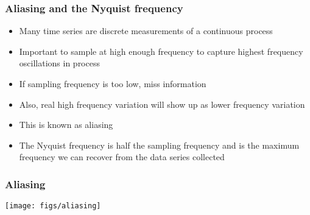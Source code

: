 \documentclass{beamer}
\begin{document}
\begin{frame}
    \frametitle{Aliasing and the Nyquist frequency}
    \begin{itemize}
        \item Many time series are discrete measurements of a continuous process
        \item Important to sample at high enough frequency to capture highest frequency oscillations in process
        \item If sampling frequency is too low, miss information
        \item Also, real high frequency variation will show up as lower frequency variation
        \item This is known as \alert{aliasing}
        \item The \alert{Nyquist frequency} is half the sampling frequency and is the maximum frequency we can recover from the data series collected
    \end{itemize}
\end{frame}

\begin{frame}
    \frametitle{Aliasing}
    \begin{center}
        \texttt{[image: figs/aliasing]}
    \end{center}
\end{frame}


\end{document}
